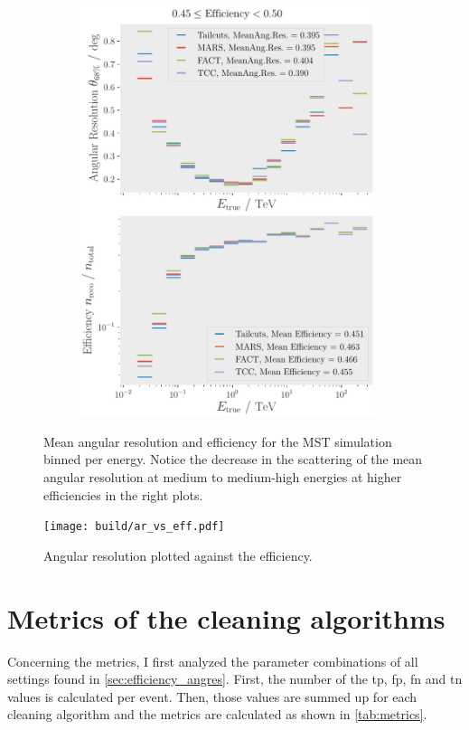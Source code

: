 \begin{figure}
\begin{subfigure}{0.48\textwidth}
        \includegraphics[width=0.95\textwidth]{plots/ar_aeff/AR_Aeff_MST_0.45_0.50.pdf}
    \end{subfigure}
    \caption{Mean angular resolution and efficiency for the MST simulation binned per energy. Notice
    the decrease in the scattering of the mean angular resolution at medium to
    medium-high energies at higher efficiencies in the right plots.}
    \label{fig:efficiency_angres}
\end{figure}
\begin{figure}
    \centering
    \texttt{[image: build/ar\_vs\_eff.pdf]}
    \caption{Angular resolution plotted against the efficiency.}
    \label{fig:ar_vs_eff}
\end{figure}


\section{Metrics of the cleaning algorithms}
\label{sec:metrics}
Concerning the metrics, I first analyzed the parameter combinations of all settings found in \autoref{sec:efficiency_angres}. First,
the number of the \gls{tp}, \gls{fp}, \gls{fn} and \gls{tn} values is calculated per event. Then,
those values are summed up for each cleaning algorithm and the metrics are calculated as shown in
\autoref{tab:metrics}.

